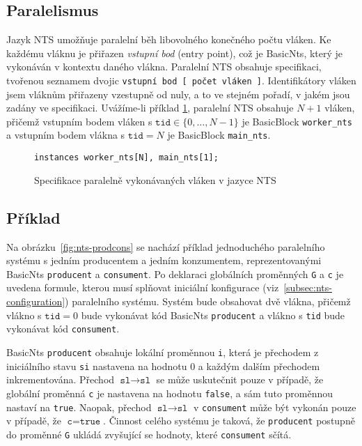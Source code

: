 \documentclass{fithesis2}
\begin{document}
\subsection{Paralelismus}
\label{subsec:nts-paralelism}
Jazyk NTS umožňuje paralelní běh libovolného konečného počtu vláken. Ke každému vláknu je přiřazen \textit{vstupní bod} (entry point), což je BasicNts, který je vykonáván v kontextu daného vlákna. Paralelní NTS obsahuje specifikaci, tvořenou seznamem dvojic \texttt{vstupní bod [ počet vláken ]}. Identifikátory vláken jsem vláknům přiřazeny vzestupně od nuly, a to ve stejném pořadí, v jakém jsou zadány ve specifikaci.  Uvážíme-li příklad \ref{fig:nts-instances}, paralelní NTS obsahuje $N+1$ vláken, přičemž vstupním bodem vláken s $\texttt{tid} \in \{ 0, \ldots, N - 1 \}$ je BasicBlock \texttt{worker_nts} a vstupním bodem vlákna s $\texttt{tid} = N$ je BasicBlock \texttt{main_nts}.

\begin{figure}[h!]
\begin{lstlisting}
instances worker_nts[N], main_nts[1];
\end{lstlisting}
\caption{Specifikace paralelně vykonávaných vláken v jazyce NTS}
\label{fig:nts-instances}
\end{figure}



\subsection{Příklad}
Na obrázku~\ref{fig:nts-prodcons} se nachází příklad jednoduchého paralelního systému s jedním producentem a jedním konzumentem, reprezentovanými BasicNts \texttt{producent} a \texttt{consument}. Po deklaraci globálních proměnných \texttt{G} a \texttt{c} je uvedena formule, kterou musí splňovat iniciální konfigurace  (viz~\ref{subsec:nts-configuration}) paralelního systému. Systém bude obsahovat dvě vlákna, přičemž vlákno s $\texttt{tid} = 0$ bude vykonávat kód BasicNts \texttt{producent} a vlákno s \texttt{tid} bude vykonávat kód \texttt{consument}.

BasicNts \texttt{producent} obsahuje lokální proměnnou \texttt{i}, která je přechodem z iniciálního stavu \texttt{si} nastavena na hodnotu $0$ a každým dalším přechodem inkrementována. Přechod $\texttt{sl} \rightarrow \texttt{sl}$ se může uskutečnit pouze v případě, že globální proměnná \texttt{c} je nastavena na  hodnotu \texttt{false}, a sám tuto proměnnou nastaví na \texttt{true}. Naopak, přechod $\texttt{sl} \rightarrow \texttt{sl}$ v \texttt{consument} může být vykonán pouze v případě, že $\texttt{c} = \texttt{true}$. Činnost celého systému je taková, že \texttt{producent} postupně do proměnné \texttt{G} ukládá zvyšující se hodnoty, které \texttt{consument} sčítá.
\end{document}
